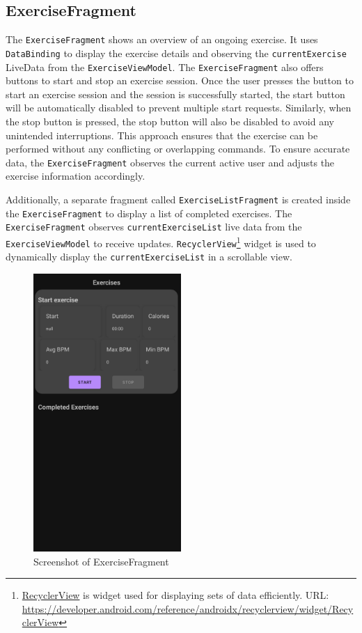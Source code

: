 \subsection{ExerciseFragment}
The \texttt{ExerciseFragment} shows an overview of an ongoing exercise. It uses \texttt{DataBinding} to display the exercise details and observing the \texttt{currentExercise} LiveData from the \texttt{ExerciseViewModel}. 
The \texttt{ExerciseFragment} also offers buttons to start and stop an exercise session.
Once the user presses the button to start an exercise session and the session is successfully started, the start button will be automatically disabled to prevent multiple start requests. Similarly, when the stop button is pressed, the stop button will also be disabled to avoid any unintended interruptions. 
This approach ensures that the exercise can be performed without any conflicting or overlapping commands.
To ensure accurate data, the \texttt{ExerciseFragment} observes the current active user and adjusts the exercise information accordingly.

Additionally, a separate fragment called \texttt{ExerciseListFragment} is created inside the \texttt{ExerciseFragment} to display a list of completed exercises. The \texttt{ExerciseFragment} observes \texttt{currentExerciseList} live data from the \texttt{ExerciseViewModel} to receive updates. 
\texttt{RecyclerView}\footnote{\url{RecyclerView} is widget used for displaying sets of data efficiently. URL: \url{https://developer.android.com/reference/androidx/recyclerview/widget/RecyclerView}} widget is used to dynamically display the \texttt{currentExerciseList} in a scrollable view. 

\begin{figure}[H]
    \centering
    \includegraphics[width=0.5\textwidth]{images/exercisefragment-screenshot.png}
    \caption{Screenshot of ExerciseFragment}
    \label{fig:exercisefragment_screenshot}
\end{figure}

